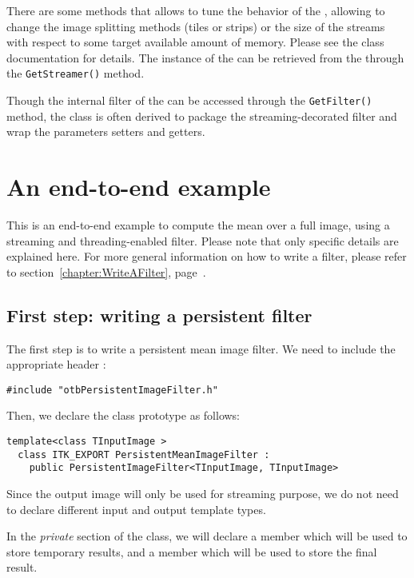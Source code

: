 There are some methods that allows to tune the behavior of the
, allowing to change the
image splitting methods (tiles or strips) or the size of the streams
with respect to some target available amount of memory. Please see the
class documentation for details. The instance of the
 can be retrieved from the
 through the
\verb?GetStreamer()? method.

Though the internal filter of the
 can be accessed
through the \verb?GetFilter()? method, the class is often derived to
package the streaming-decorated filter and wrap the parameters setters
and getters.

\section{An end-to-end example}

This is an end-to-end example to compute the mean over a full image,
using a streaming and threading-enabled filter. Please note that only
specific details are explained here. For more general information on
how to write a filter, please refer to
section~\ref{chapter:WriteAFilter}, page~\pageref{chapter:WriteAFilter}.

\subsection{First step: writing a persistent filter}

The first step is to write a persistent mean image filter. We need to
include the appropriate header :

\begin{lstlisting}
#include "otbPersistentImageFilter.h"
\end{lstlisting}

Then, we declare the class prototype as follows:

\begin{lstlisting}
template<class TInputImage >
  class ITK_EXPORT PersistentMeanImageFilter :
    public PersistentImageFilter<TInputImage, TInputImage>
\end{lstlisting}

Since the output image will only be used for streaming purpose, we do
not need to declare different input and output template types.

In the \emph{private} section of the class, we will declare a member which
will be used to store temporary results, and a member which will be
used to store the final result.

